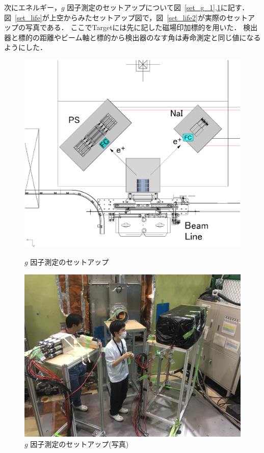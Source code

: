 次にエネルギー，$g$ 因子測定のセットアップについて図~\ref{set_g_1},\ref{set_g_2}に記す．
図~\ref{set_life}が上空からみたセットアップ図で，図~\ref{set_life2}が実際のセットアップの写真である．
ここでTargetには先に記した磁場印加標的を用いた．
検出器と標的の距離やビーム軸と標的から検出器のなす角は寿命測定と同じ値になるようにした．
\begin{figure}[H]
  \begin{minipage}{0.45\hsize}
    \begin{center}
      \includegraphics[width=1\textwidth]{figure/tajima/g-2_3.png}
      \caption{$g$ 因子測定のセットアップ}
      \label{set_g_1}
    \end{center}
  \end{minipage}
  \begin{minipage}{0.45\hsize}
    \begin{center}
      \includegraphics[width=1.1\textwidth]{figure/tajima/g.jpg}
      \caption{$g$ 因子測定のセットアップ(写真)}
      \label{set_g_2}
    \end{center}
  \end{minipage}
\end{figure}
